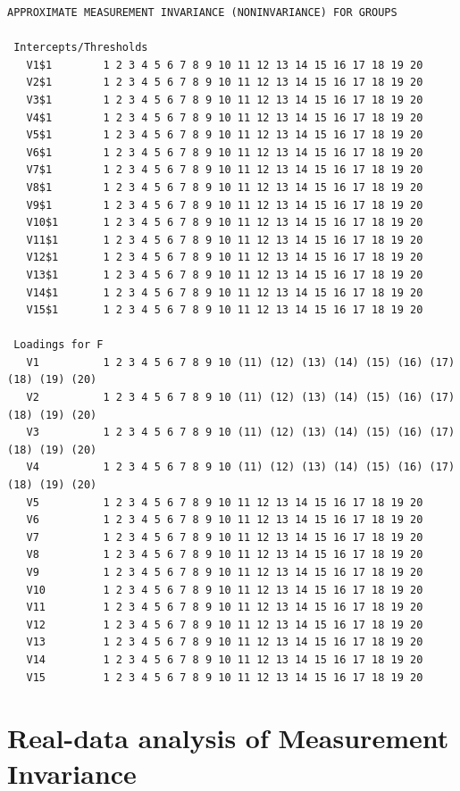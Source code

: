\documentclass[]{book}
\begin{document}
\begin{verbatim}
APPROXIMATE MEASUREMENT INVARIANCE (NONINVARIANCE) FOR GROUPS

 Intercepts/Thresholds
   V1$1        1 2 3 4 5 6 7 8 9 10 11 12 13 14 15 16 17 18 19 20
   V2$1        1 2 3 4 5 6 7 8 9 10 11 12 13 14 15 16 17 18 19 20
   V3$1        1 2 3 4 5 6 7 8 9 10 11 12 13 14 15 16 17 18 19 20
   V4$1        1 2 3 4 5 6 7 8 9 10 11 12 13 14 15 16 17 18 19 20
   V5$1        1 2 3 4 5 6 7 8 9 10 11 12 13 14 15 16 17 18 19 20
   V6$1        1 2 3 4 5 6 7 8 9 10 11 12 13 14 15 16 17 18 19 20
   V7$1        1 2 3 4 5 6 7 8 9 10 11 12 13 14 15 16 17 18 19 20
   V8$1        1 2 3 4 5 6 7 8 9 10 11 12 13 14 15 16 17 18 19 20
   V9$1        1 2 3 4 5 6 7 8 9 10 11 12 13 14 15 16 17 18 19 20
   V10$1       1 2 3 4 5 6 7 8 9 10 11 12 13 14 15 16 17 18 19 20
   V11$1       1 2 3 4 5 6 7 8 9 10 11 12 13 14 15 16 17 18 19 20
   V12$1       1 2 3 4 5 6 7 8 9 10 11 12 13 14 15 16 17 18 19 20
   V13$1       1 2 3 4 5 6 7 8 9 10 11 12 13 14 15 16 17 18 19 20
   V14$1       1 2 3 4 5 6 7 8 9 10 11 12 13 14 15 16 17 18 19 20
   V15$1       1 2 3 4 5 6 7 8 9 10 11 12 13 14 15 16 17 18 19 20

 Loadings for F
   V1          1 2 3 4 5 6 7 8 9 10 (11) (12) (13) (14) (15) (16) (17) (18) (19) (20)
   V2          1 2 3 4 5 6 7 8 9 10 (11) (12) (13) (14) (15) (16) (17) (18) (19) (20)
   V3          1 2 3 4 5 6 7 8 9 10 (11) (12) (13) (14) (15) (16) (17) (18) (19) (20)
   V4          1 2 3 4 5 6 7 8 9 10 (11) (12) (13) (14) (15) (16) (17) (18) (19) (20)
   V5          1 2 3 4 5 6 7 8 9 10 11 12 13 14 15 16 17 18 19 20
   V6          1 2 3 4 5 6 7 8 9 10 11 12 13 14 15 16 17 18 19 20
   V7          1 2 3 4 5 6 7 8 9 10 11 12 13 14 15 16 17 18 19 20
   V8          1 2 3 4 5 6 7 8 9 10 11 12 13 14 15 16 17 18 19 20
   V9          1 2 3 4 5 6 7 8 9 10 11 12 13 14 15 16 17 18 19 20
   V10         1 2 3 4 5 6 7 8 9 10 11 12 13 14 15 16 17 18 19 20
   V11         1 2 3 4 5 6 7 8 9 10 11 12 13 14 15 16 17 18 19 20
   V12         1 2 3 4 5 6 7 8 9 10 11 12 13 14 15 16 17 18 19 20
   V13         1 2 3 4 5 6 7 8 9 10 11 12 13 14 15 16 17 18 19 20
   V14         1 2 3 4 5 6 7 8 9 10 11 12 13 14 15 16 17 18 19 20
   V15         1 2 3 4 5 6 7 8 9 10 11 12 13 14 15 16 17 18 19 20
\end{verbatim}

\hypertarget{real-data-analysis-of-measurement-invariance}{%
\section{Real-data analysis of Measurement Invariance}\label{real-data-analysis-of-measurement-invariance}}
\end{document}

